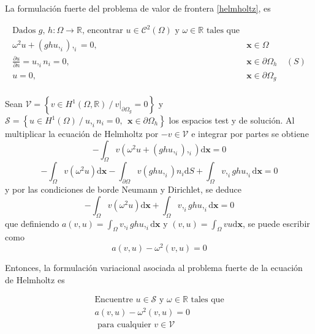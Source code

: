 La formulaci\'on fuerte del problema de valor de frontera \eqref{helmholtz}, es

\begin{align*}
\text{Dados $g$, $h: \Omega \rightarrow \mathbb{R}$, encontrar $u\in\mathcal{C}^2(\Omega)$ y $\omega \in \mathbb{R} $ tales que}\\
\omega^2 u + (gh u,_i),_i  = 0, \ \ \ \ & \boldsymbol{x} \in \Omega \\
\frac{\partial u}{\partial n} = u,_i n_i = 0, \ \ \ \ & \boldsymbol{x} \in \partial \Omega_h \ & (S) \\
u=0, \ \ \ \ &\boldsymbol{x} \in \partial \Omega_g\\
\end{align*}

 Sean 
 $ \mathcal{V} = \left \{ v \in H^1 (\Omega, \mathbb{R}) \ /\  v|_{\partial \Omega_g} = 0 \right \}$ y
  $ \mathcal{S} = \left \{ u \in H^1 (\Omega) \ /\  u,_i n_i = 0, \ \ \boldsymbol{x} \in \partial \Omega_h \right \}$ los espacios test y de soluci\'on. Al multiplicar la ecuaci\'on de Helmholtz por $-v \in \mathcal{V}$ e integrar por partes se obtiene
$$-\int_{\Omega} v \left( \omega^2 u + (gh u,_i),_i \right) \mathrm{d}\boldsymbol{x} = 0$$
$$-\int_{\Omega} v ( \omega^2 u )\mathrm{d}\boldsymbol{x} -\int_{\partial \Omega} v (gh u,_i) n_i \mathrm{d} S
+\int_{\Omega} v,_i g h u,_i \mathrm{d}\boldsymbol{x} = 0$$
y por las condiciones de borde Neumann y Dirichlet, se deduce
$$-\int_{\Omega} v ( \omega^2 u )\mathrm{d}\boldsymbol{x} 
+\int_{\Omega} v,_i g h u,_i \mathrm{d}\boldsymbol{x} = 0$$
que definiendo $a(v,u)=\int_{\Omega} v,_i g h u,_i \mathrm{d}\boldsymbol{x}$ y $(v,u)=\int_{\Omega} v u\mathrm{d}\boldsymbol{x} $, se puede escribir como
\begin{equation}
a(v, u) - \omega^2 (v, u) = 0
\label{eq:debil_abstracta}
\end{equation}

Entonces, la formulaci\'on variacional asociada al problema fuerte de la ecuaci\'on de Helmholtz es

\begin{equation}
  \begin{split}
  \text{Encuentre $u\in\mathcal{S}$ y $\omega \in \mathbb{R}$  tales que} \\
    a(v,u) - \omega^2 (v,u) = 0 \\
    \text{ para cualquier $v \in \mathcal{V}$}
  \end{split}
  \tag{W}
\end{equation}


